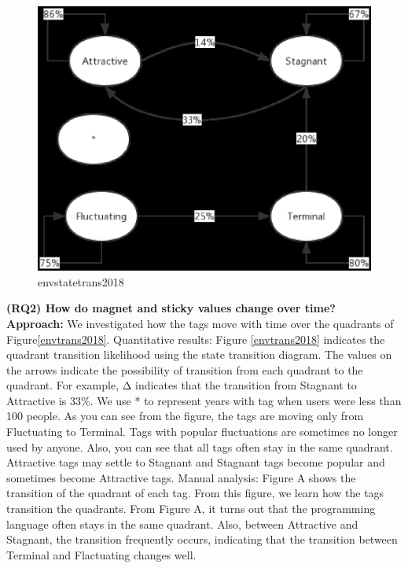 \documentclass[conference]{IEEEtran}
\begin{document}
\begin{figure}[t]
 \centering
 \includegraphics[width=.9\hsize]{img/EnvStateTrans2018.eps}  
 \caption{envstatetrans2018} 
 \label{fig:envtrans2018} 
\end{figure}

\textbf{(RQ2) How do magnet and sticky values change over time?} \\
\textbf{Approach:}
We investigated how the tags move with time over the quadrants of Figure\ref{envtrans2018}. 
Quantitative results:
Figure \ref{envtrans2018} indicates the quadrant transition likelihood using the state transition diagram. The values on the arrows indicate the possibility of transition from each quadrant to the quadrant. For example, Δ indicates that the transition from Stagnant to Attractive is 33\%. We use * to represent years with tag when users were less than 100 people.
As you can see from the figure, the tags are moving only from Fluctuating to Terminal. Tags with popular fluctuations are sometimes no longer used by anyone. Also, you can see that all tags often stay in the same quadrant. Attractive tags may settle to Stagnant and Stagnant tags become popular and sometimes become Attractive tags. Manual analysis:
Figure A shows the transition of the quadrant of each tag. From this figure, we learn how the tags transition the quadrants.
From Figure A, it turns out that the programming language often stays in the same quadrant. Also, between Attractive and Stagnant, the transition frequently occurs, indicating that the transition between Terminal and Flactuating changes well.
\end{document}
